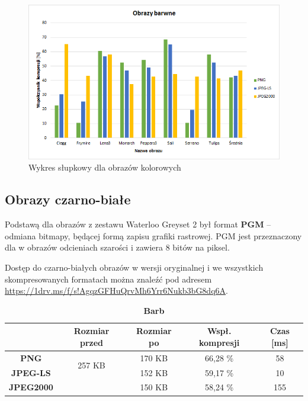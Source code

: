 \begin{figure}[!h]
	\centering
	\includegraphics[width=1.1\textwidth]{./color.png}
	\caption{Wykres słupkowy dla obrazów kolorowych}
	\label{img:color}
\end{figure}

\clearpage








\subsection{Obrazy czarno-białe}

Podstawą dla obrazów z zestawu Waterloo Greyset 2 był format \textbf{PGM} -- odmiana bitmapy, będącej formą zapisu grafiki rastrowej. PGM jest przeznaczony dla w obrazów odcieniach szarości i zawiera 8 bitów na piksel.

Dostęp do czarno-białych obrazów w wersji oryginalnej i we wszystkich skompresowanych formatach można znaleźć pod adresem \url{https://1drv.ms/f/s!AgqzGFHuQrvMh6Yrr6Nukb3bG8dq6A}.

\begin{table}[!h]
	\centering
	\caption{\textbf{Barb}}
	\label{my-label}
	\begin{tabular}{|c|c|c|c|c|}                                             
		\hline
		& \textbf{Rozmiar przed} & \textbf{Rozmiar po} & \textbf{Wspł. kompresji} & \textbf{Czas {[}ms{]}} \\ \hline 
		\textbf{PNG}      &          \multicolumn{1}{c|}{\multirow{2}{*}{257 KB}}             &      170 KB               &    66,28 \%                     &           58                  \\\cline{3-5}
		\textbf{JPEG-LS}  &                        &       152 KB              &        59,17 \%                 &        10                  \\\cline{3-5}
		\textbf{JPEG2000} &                        &     150 KB                &        58,24 \%                 &        155              \\ \hline
	\end{tabular}
\end{table}

